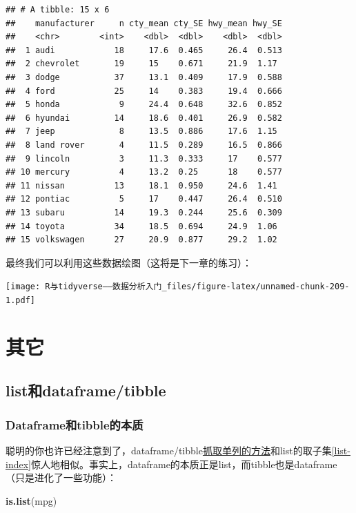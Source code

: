 \documentclass[]{book}
\newenvironment{Shaded}{\begin{snugshade}}{\end{snugshade}}
\newcommand{\KeywordTok}[1]{\textcolor[rgb]{0.13,0.29,0.53}{\textbf{#1}}}
\newcommand{\NormalTok}[1]{#1}
\begin{document}
\begin{verbatim}
## # A tibble: 15 x 6
##    manufacturer     n cty_mean cty_SE hwy_mean hwy_SE
##    <chr>        <int>    <dbl>  <dbl>    <dbl>  <dbl>
##  1 audi            18     17.6  0.465     26.4  0.513
##  2 chevrolet       19     15    0.671     21.9  1.17 
##  3 dodge           37     13.1  0.409     17.9  0.588
##  4 ford            25     14    0.383     19.4  0.666
##  5 honda            9     24.4  0.648     32.6  0.852
##  6 hyundai         14     18.6  0.401     26.9  0.582
##  7 jeep             8     13.5  0.886     17.6  1.15 
##  8 land rover       4     11.5  0.289     16.5  0.866
##  9 lincoln          3     11.3  0.333     17    0.577
## 10 mercury          4     13.2  0.25      18    0.577
## 11 nissan          13     18.1  0.950     24.6  1.41 
## 12 pontiac          5     17    0.447     26.4  0.510
## 13 subaru          14     19.3  0.244     25.6  0.309
## 14 toyota          34     18.5  0.694     24.9  1.06 
## 15 volkswagen      27     20.9  0.877     29.2  1.02
\end{verbatim}

最终我们可以利用这些数据绘图（这将是下一章的练习）：

\texttt{[image: R与tidyverse——数据分析入门\_files/figure-latex/unnamed-chunk-209-1.pdf]}

\hypertarget{tibble-misc}{%
\section{其它}\label{tibble-misc}}

\hypertarget{list-and-df}{%
\subsection{list和dataframe/tibble}\label{list-and-df}}

\hypertarget{dataframetibble}{%
\subsubsection{Dataframe和tibble的本质}\label{dataframetibble}}

聪明的你也许已经注意到了，dataframe/tibble\protect\hyperlink{single-column}{抓取单列的方法}和list的取子集\ref{list-index}惊人地相似。事实上，dataframe的本质正是list，而tibble也是dataframe（只是进化了一些功能）：

\begin{Shaded}
\begin{Highlighting}[]
\KeywordTok{is.list}\NormalTok{(mpg)}
\end{Highlighting}
\end{Shaded}
\end{document}
